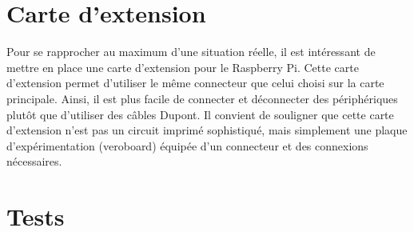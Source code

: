 \section{Carte d'extension}

Pour se rapprocher au maximum d'une situation réelle, il est intéressant de mettre en place une carte d'extension pour le Raspberry Pi.
Cette carte d'extension permet d'utiliser le même connecteur que celui choisi sur la carte principale.
Ainsi, il est plus facile de connecter et déconnecter des périphériques plutôt que d'utiliser des câbles Dupont.
Il convient de souligner que cette carte d'extension n'est pas un circuit imprimé sophistiqué, mais simplement une plaque d'expérimentation (veroboard) équipée d'un connecteur et des connexions nécessaires.

\section{Tests}


